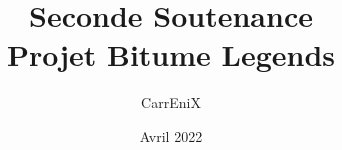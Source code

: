 \documentclass[11pt,a4paper]{article}
\begin{document}
\title{Seconde Soutenance \\ {\large Projet Bitume Legends}}
\author{CarrEniX}
\date{Avril 2022}
\maketitle


\tableofcontents
\clearpage
\end{document}
